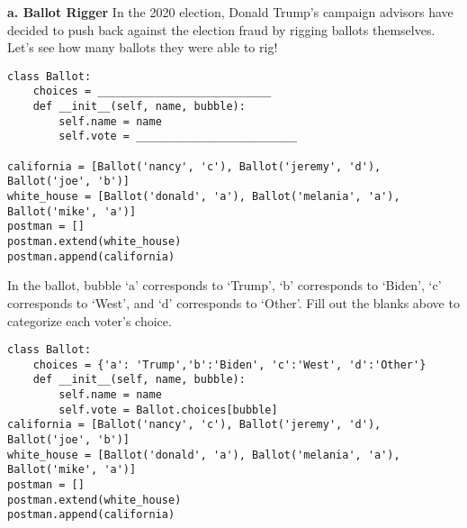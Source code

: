 \begin{blocksection}
\question
\textbf{a. Ballot Rigger} In the 2020 election, Donald Trump's campaign advisors have decided to push back against the election fraud by rigging ballots themselves. Let's see how many ballots they were able to rig!

\begin{lstlisting}
class Ballot:
    choices = ___________________________
    def __init__(self, name, bubble):
        self.name = name
        self.vote = _________________________

california = [Ballot('nancy', 'c'), Ballot('jeremy', 'd'), Ballot('joe', 'b')]
white_house = [Ballot('donald', 'a'), Ballot('melania', 'a'), Ballot('mike', 'a')]
postman = []
postman.extend(white_house)
postman.append(california)
\end{lstlisting}
In the ballot, bubble ‘a’ corresponds to ‘Trump’, ‘b’ corresponds to ‘Biden’, ‘c’ corresponds to ‘West’, and ‘d’ corresponds to ‘Other’. Fill out the blanks above to categorize each voter's choice.
\begin{solution}[1in]
\begin{lstlisting}
class Ballot:
    choices = {'a': 'Trump','b':'Biden', 'c':'West', 'd':'Other'}
    def __init__(self, name, bubble):
        self.name = name
        self.vote = Ballot.choices[bubble]
california = [Ballot('nancy', 'c'), Ballot('jeremy', 'd'), Ballot('joe', 'b')]
white_house = [Ballot('donald', 'a'), Ballot('melania', 'a'), Ballot('mike', 'a')]
postman = []
postman.extend(white_house)
postman.append(california)
\end{lstlisting}
\end{solution}
\end{blocksection}

